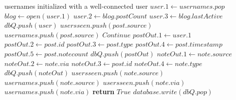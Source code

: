 \begin{algorithmic}[1]
    \Require usernames initialized with a well-connected user
    \State $user.1 \gets usernames.pop$
    \State $blog \gets open(user.1)$
    \State $user.2 \gets blog.postCount$
    \State $user.3 \gets blog.lastActive$
    \State $dbQ.push(user)$ 
    \State $usersseen.push(post.source)$
    \State $usernames.push(post.source)$
    \EndIf
    \State $Continue$
    \State $postOut.1 \gets user.1$
    \State $postOut.2 \gets post.id$
    \State $postOut.3 \gets post.type$
    \State $postOut.4 \gets post.timestamp$
    \State $postOut.5 \gets post.notecount$    
    \State $dbQ.push(postOut)$
    \State $noteOut.1 \gets note.source$
    \State $noteOut.2 \gets note.via$
    \State $noteOut.3 \gets post.id$
    \State $noteOut.4 \gets note.type$
    \State $dbQ.push(noteOut)$
    \State $usersseen.push(note.source)$
    \State $usernames.push(note.source)$
    \EndIf
    \State $usersseen.push(note.via)$
    \State $usernames.push(note.via)$
    \EndIf
    \EndFor
    \EndIf
    \EndFor
    \EndWhile
    \State \textbf{return} $True$    
    \EndProcedure
    \State $database.write(dbQ.pop)$
    \EndWhile
    \EndProcedure
  \end{algorithmic}
